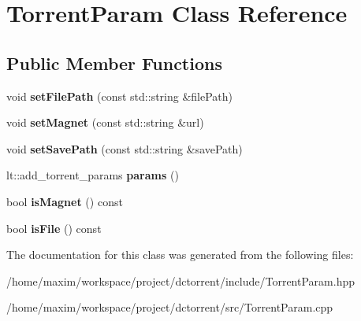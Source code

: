 \hypertarget{class_torrent_param}{}\section{Torrent\+Param Class Reference}
\label{class_torrent_param}
\subsection*{Public Member Functions}
\begin{DoxyCompactItemize}
\item 
\mbox{\label{class_torrent_param_acdc640b26946ecec8aaee930c110c0c1}} 
void {\bfseries set\+File\+Path} (const std\+::string \&file\+Path)
\item 
\mbox{\label{class_torrent_param_a6f4c51423ed8424f6e3ecf20f487e5e8}} 
void {\bfseries set\+Magnet} (const std\+::string \&url)
\item 
\mbox{\label{class_torrent_param_a99d7b501c72b4ce55165bb52f05ea96f}} 
void {\bfseries set\+Save\+Path} (const std\+::string \&save\+Path)
\item 
\mbox{\label{class_torrent_param_ad0b9c2afa31bf6656320729f411080c7}} 
lt\+::add\+\_\+torrent\+\_\+params {\bfseries params} ()
\item 
\mbox{\label{class_torrent_param_a197b1db24cc471524e4d7d6f16659d35}} 
bool {\bfseries is\+Magnet} () const
\item 
\mbox{\label{class_torrent_param_a3cbd43a4cc67bd93be05f16abb555a63}} 
bool {\bfseries is\+File} () const
\end{DoxyCompactItemize}


The documentation for this class was generated from the following files\+:\begin{DoxyCompactItemize}
\item 
/home/maxim/workspace/project/dctorrent/include/Torrent\+Param.\+hpp\item 
/home/maxim/workspace/project/dctorrent/src/Torrent\+Param.\+cpp\end{DoxyCompactItemize}
